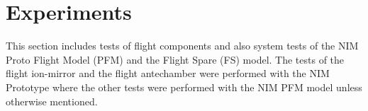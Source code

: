 \section{Experiments} \label{sec:Exp}
	
	This section includes tests of flight components and also system tests of the NIM Proto Flight Model (PFM) and the Flight Spare (FS) model. The tests of the flight ion-mirror and the flight antechamber were performed with the NIM Prototype where the other tests were performed with the NIM PFM model unless otherwise mentioned.


